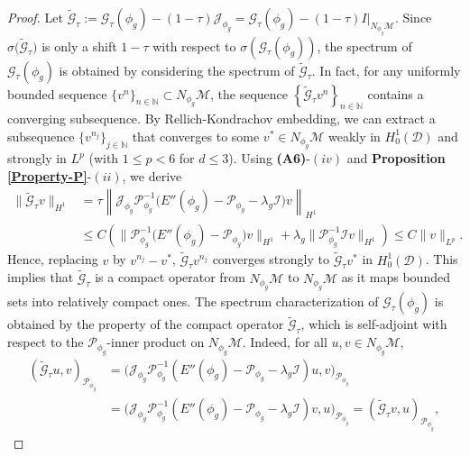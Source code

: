 \documentclass[preprint,3p]{elsarticle}
\begin{document}
\begin{proof}
	Let $\widetilde{\mathcal{G}}_{\tau}:=\mathcal{G}_{\tau}(\phi_g)-(1-\tau)\mathcal{J}_{\phi_g}=\mathcal{G}_{\tau}(\phi_g)-(1-\tau)I|_{N_{\phi_g}\mathcal{M}}$.
	Since $\sigma\big(\widetilde{\mathcal{G}}_{\tau}\big)$ is only a shift $1-\tau$ with respect to $\sigma\left(\mathcal{G}_{\tau}(\phi_g)\right)$, the spectrum of $\mathcal{G}_{\tau}(\phi_g)$ is obtained by considering the spectrum of $\widetilde{\mathcal{G}}_{\tau}$. In fact, for any {uniformly} bounded sequence $\big\{v^n\big\}_{n\in\mathbb{N}}\subset N_{\phi_g}\mathcal{M}$, the sequence $\left\{\widetilde{\mathcal{G}}_{\tau}v^n\right\}_{n\in\mathbb{N}}$ contains a converging subsequence. By Rellich-Kondrachov embedding, we can extract a subsequence $\big\{v^{n_j}\big\}_{j\in\mathbb{N}}$ that converges to some $v^*\in N_{\phi_g}\mathcal{M}$ weakly in $H_0^1(\mathcal{D})$ and strongly in $L^p$ (with $1\le p<6$ for $d\le3$). Using {\bf (A6)}-$(iv)$ and {\bf Proposition \ref{Property-P}}-$(ii)$, we derive
	\begin{align*}
		\big\|\widetilde{\mathcal{G}}_{\tau}v\big\|_{H^1}&=\tau\left\|\mathcal{J}_{\phi_g}\mathcal{P}^{-1}_{\phi_g}\big(E''(\phi_g)-\mathcal{P}_{\phi_g}-\lambda_g\mathcal{I}\big)v\right\|_{H^1}\\
		&\le C\left(\big\|\mathcal{P}^{-1}_{\phi_g}\big(E''(\phi_g)-\mathcal{P}_{\phi_g}\big)v\big\|_{H^1}+\lambda_g\big\|\mathcal{P}^{-1}_{\phi_g}\mathcal{I}v\big\|_{H^1}\right)\le C\|v\|_{L^{p}}.
	\end{align*}
	Hence, replacing $v$ by $v^{n_j}-v^*$, $\widetilde{\mathcal{G}}_{\tau}v^{n_j}$ converges strongly to $\widetilde{\mathcal{G}}_{\tau}v^*$ in $H_0^1(\mathcal{D})$. This implies that $\widetilde{\mathcal{G}}_{\tau}$ is a compact operator from $N_{\phi_g}\mathcal{M}$ to $N_{\phi_g}\mathcal{M}$ {as it maps bounded sets into relatively compact ones.} The spectrum characterization of $\mathcal{G}_{\tau}(\phi_g)$ is obtained by the property of the compact operator $\widetilde{\mathcal{G}}_{\tau}$, {which is self-adjoint with respect to the $\mathcal{P}_{\phi_g}$-inner product on $N_{\phi_g}\mathcal{M}$. 
	Indeed, for all $u, v \in N_{\phi_g}\mathcal{M}$,
	\begin{align*}
		(\widetilde{\mathcal{G}}_{\tau}u,v)_{\mathcal{P}_{\phi_g}}&=\Big(\mathcal{J}_{\phi_g}\mathcal{P}^{-1}_{\phi_g} \left(E''(\phi_g) - \mathcal{P}_{\phi_g}-\lambda_g \mathcal{I}\right)u,v\Big)_{\mathcal{P}_{\phi_g}}\\
		&=\Big(\mathcal{J}_{\phi_g}\mathcal{P}^{-1}_{\phi_g} \left(E''(\phi_g) -\mathcal{P}_{\phi_g} - \lambda_g \mathcal{I}\right)v,u\Big)_{\mathcal{P}_{\phi_g}}=(\widetilde{\mathcal{G}}_{\tau}v,u)_{\mathcal{P}_{\phi_g}},

\end{align*}}
\end{proof}
\end{document}
